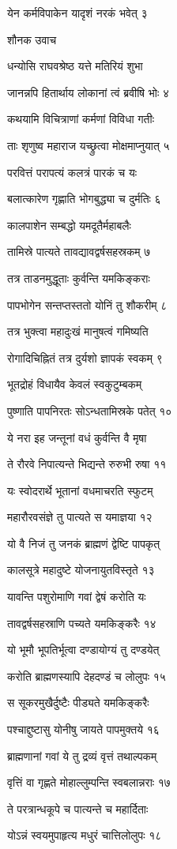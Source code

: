 येन कर्मविपाकेन यादृशं नरकं भवेत् ३

शौनक उवाच

धन्योसि राघवश्रेष्ठ यत्ते मतिरियं शुभा

जानन्नपि हितार्थाय लोकानां त्वं ब्रवीषि भोः ४

कथयामि विचित्राणां कर्मणां विविधा गतीः

ताः शृणुष्व महाराज यच्छ्रुत्वा मोक्षमाप्नुयात् ५

परवित्तं परापत्यं कलत्रं पारकं च यः

बलात्कारेण गृह्णाति भोगबुद्ध्या च दुर्मतिः ६

कालपाशेन सम्बद्धो यमदूतैर्महाबलैः

तामिस्रे पात्यते तावद्यावद्वर्षसहस्रकम् ७

तत्र ताडनमुद्धूताः कुर्वन्ति यमकिङ्कराः

पापभोगेन सन्तप्तस्ततो योनिं तु शौकरीम् ८

तत्र भुक्त्वा महादुःखं मानुषत्वं गमिष्यति

रोगादिचिह्नितं तत्र दुर्यशो ज्ञापकं स्वकम् ९

भूतद्रोहं विधायैव केवलं स्वकुटुम्बकम्

पुष्णाति पापनिरतः सोऽन्धतामिस्रके पतेत् १०

ये नरा इह जन्तूनां वधं कुर्वन्ति वै मृषा

ते रौरवे निपात्यन्ते भिद्यन्ते रुरुभी रुषा ११

यः स्वोदरार्थे भूतानां वधमाचरति स्फुटम्

महारौरवसंज्ञे तु पात्यते स यमाज्ञया १२

यो वै निजं तु जनकं ब्राह्मणं द्वेष्टि पापकृत्

कालसूत्रे महादुष्टे योजनायुतविस्तृते १३

यावन्ति पशुरोमाणि गवां द्वेषं करोति यः

तावद्वर्षसहस्राणि पच्यते यमकिङ्करैः १४

यो भूमौ भूपतिर्भूत्वा दण्डायोग्यं तु दण्डयेत्

करोति ब्राह्मणस्यापि देहदण्डं च लोलुपः १५

स सूकरमुखैर्दुष्टैः पीड्यते यमकिङ्करैः

पश्चाद्दुष्टासु योनीषु जायते पापमुक्तये १६

ब्राह्मणानां गवां ये तु द्रव्यं वृत्तं तथाल्पकम्

वृत्तिं वा गृह्णते मोहाल्लुम्पन्ति स्वबलान्नराः १७

ते परत्रान्धकूपे च पात्यन्ते च महार्दिताः

योऽन्नं स्वयमुपाहृत्य मधुरं चात्तिलोलुपः १८

